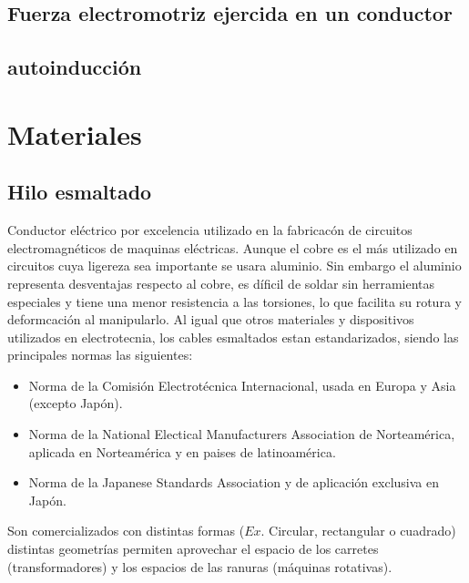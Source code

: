 \documentclass{report}
\begin{document}
  \subsection{Fuerza electromotriz ejercida en un conductor}\label{ssec:fuerza_electromotriz_conductor}

  \subsection{autoinducción}\label{ssec:autoinducción}


\label{chap:2}

  \section{Materiales}\label{sec:materiales}
  
    \subsection{Hilo esmaltado}\label{ssec:hilo_esmaltado}
    
      Conductor eléctrico por excelencia utilizado en la fabricacón de circuitos electromagnéticos de maquinas eléctricas.
      Aunque el cobre es el más utilizado en circuitos cuya ligereza sea importante se usara aluminio. Sin embargo el aluminio representa 
      desventajas respecto al cobre, es díficil de soldar sin herramientas especiales y tiene una menor resistencia a las torsiones, lo que facilita
      su rotura y deformcación al manipularlo.
      \fspace{1em}
      Al igual que otros materiales y dispositivos utilizados en electrotecnia, los cables esmaltados estan estandarizados, siendo las principales normas
      las siguientes: 
      \begin{itemize}
        \item{}
          Norma de la Comisión Electrotécnica Internacional, usada en Europa y Asia (excepto Japón).
      \item{}
          Norma de la National Electical Manufacturers Association de Norteamérica, aplicada en Norteamérica y en paises de latinoamérica.
        \item{}
          Norma de la Japanese Standards Association y de aplicación exclusiva en Japón.
      \end{itemize}
      \vspace{1em}
      Son comercializados con distintas formas ($Ex.$ Circular, rectangular o cuadrado) distintas geometrías permiten
      aprovechar el espacio de los carretes (transformadores) y los espacios de las ranuras (máquinas rotativas).  
      
\end{document}
